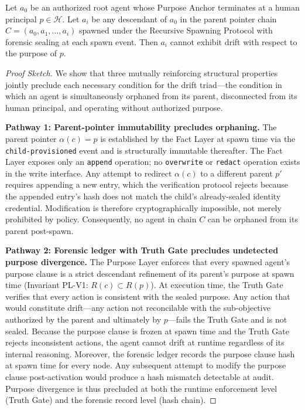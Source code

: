 \begin{theorem}
\label{th:drift-prevention}
Let $a_0$ be an authorized root agent whose Purpose Anchor terminates at a human principal $p \in \mathcal{H}$. Let $a_i$ be any descendant of $a_0$ in the parent pointer chain $C = (a_0, a_1, \ldots, a_i)$ spawned under the Recursive Spawning Protocol with forensic sealing at each spawn event. Then $a_i$ cannot exhibit drift with respect to the purpose of $p$.
\end{theorem}

\begin{proof}[Proof Sketch]
We show that three mutually reinforcing structural properties jointly preclude each necessary condition for the drift triad---the condition in which an agent is simultaneously orphaned from its parent, disconnected from its human principal, and operating without authorized purpose.

\medskip
\noindent\textbf{Pathway 1: Parent-pointer immutability precludes orphaning.}
The parent pointer $\alpha(c) = p$ is established by the Fact Layer at spawn time via the \texttt{child-provisioned} event and is structurally immutable thereafter. The Fact Layer exposes only an \texttt{append} operation; no \texttt{overwrite} or \texttt{redact} operation exists in the write interface. Any attempt to redirect $\alpha(c)$ to a different parent $p'$ requires appending a new entry, which the verification protocol rejects because the appended entry's hash does not match the child's already-sealed identity credential. Modification is therefore cryptographically impossible, not merely prohibited by policy. Consequently, no agent in chain $C$ can be orphaned from its parent post-spawn.

\medskip
\noindent\textbf{Pathway 2: Forensic ledger with Truth Gate precludes undetected purpose divergence.}
The Purpose Layer enforces that every spawned agent's purpose clause is a strict descendant refinement of its parent's purpose at spawn time (Invariant PL-V1: $R(c) \subset R(p)$). At execution time, the Truth Gate verifies that every action is consistent with the sealed purpose. Any action that would constitute drift---any action not reconcilable with the sub-objective authorized by the parent and ultimately by $p$---fails the Truth Gate and is not sealed. Because the purpose clause is frozen at spawn time and the Truth Gate rejects inconsistent actions, the agent cannot drift at runtime regardless of its internal reasoning. Moreover, the forensic ledger records the purpose clause hash at spawn time for every node. Any subsequent attempt to modify the purpose clause post-activation would produce a hash mismatch detectable at audit. Purpose divergence is thus precluded at both the runtime enforcement level (Truth Gate) and the forensic record level (hash chain).


\end{proof}
